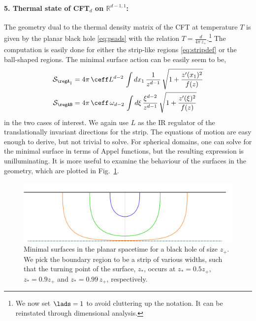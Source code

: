 \documentclass[12pt,openany]{book}
\begin{document}
\paragraph{5. Thermal state of CFT$_d$ on ${\mathbb R}^{d-1,1}$:} The geometry dual to the thermal density matrix of the CFT at temperature $T$ is given by the planar  black hole \eqref{eq:psads} with the relation $ T = \frac{d}{4\pi\, z_+}$.\footnote{We now set $\lads =1$ to avoid cluttering up the notation. It can be reinstated through dimensional analysis.} The computation is easily done for either the strip-like regions \eqref{eq:stripdef} or the ball-shaped regions. The minimal surface  action can be easily seem to be,
%
\begin{equation}
\begin{split}
{\cal S}_{\regA_{\parallel}}  &= 4\pi\,\ceff L^{d-2}\, \int dx_1 \, \frac{1}{z^{d-1}}\, \sqrt{ 1+\frac{z'(x_1)^2}{f(z)}}
 \\
{\cal S}_{\regAB} &=  4\pi\,\ceff\, \omega_{d-2}\, \int d\xi \, \frac{\xi^{d-2}}{z^{d-1}}\, \sqrt{ 1+\frac{z'(\xi)^2}{f(z)}}
\label{}
\end{split}
\end{equation}
%
in the two cases of interest. We again use $L$  as the IR regulator of the translationally invariant directions for the strip. The equations of motion are easy enough to derive, but not trivial to solve. For  spherical domains, one can solve for the minimal surface in terms of Appel functions, but the resulting expression is unilluminating. It is more useful to examine the behaviour of the surfaces in the geometry, which are plotted in Fig.~\ref{f:PSAdS5strip}.

\begin{figure}[htbp]
\begin{center}
\includegraphics[width=5in]{figures/SurfacePSAdS}
\caption{Minimal surfaces in the planar  spacetime for a black hole of size $z_+$. We pick the boundary region to be a strip of various widths, such that the turning point of the surface, $z_*$, occurs at
$z_* =0.5 z_+$, $z_* =0.9 z_+$ and $z_* = 0.99 \,z_+$, respectively.
}
\label{f:PSAdS5strip}
\end{center}
\end{figure}
%
\end{document}
